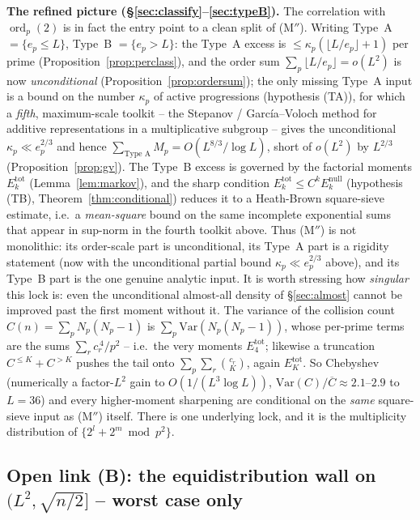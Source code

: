 \documentclass[11pt]{article}
\theoremstyle{plain}
\theoremstyle{definition}
\theoremstyle{remark}
\newcommand{\ord}{\operatorname{ord}}
\newcommand{\ep}{e_p}
\begin{document}
\textbf{The refined picture (\S\ref{sec:classify}--\ref{sec:typeB}).} The
correlation with $\ord_p(2)$ is in fact the entry point to a clean split of
(M$''$). Writing Type~A $=\{\ep\le L\}$, Type~B $=\{\ep>L\}$: the Type~A excess is
$\le\kappa_p(\lfloor L/\ep\rfloor+1)$ per prime (Proposition~\ref{prop:perclass}),
and the order sum $\sum_p\lfloor L/\ep\rfloor=o(L^2)$ is now
\emph{unconditional} (Proposition~\ref{prop:ordersum}); the only missing Type~A
input is a bound on the number $\kappa_p$ of active progressions (hypothesis
(TA)), for which a \emph{fifth}, maximum-scale toolkit -- the Stepanov /
García--Voloch method for additive representations in a multiplicative subgroup --
gives the unconditional $\kappa_p\ll\ep^{2/3}$ and hence
$\sum_{\text{Type A}}M_p=O(L^{8/3}/\log L)$, short of $o(L^2)$ by $L^{2/3}$
(Proposition~\ref{prop:gv}). The Type~B excess is governed by
the factorial moments $E_k^{\mathrm{tot}}$ (Lemma~\ref{lem:markov}), and the sharp
condition $E_k^{\mathrm{tot}}\le C^kE_k^{\mathrm{null}}$ (hypothesis (TB),
Theorem~\ref{thm:conditional}) reduces it to a Heath-Brown square-sieve estimate,
i.e.\ a \emph{mean-square} bound on the same incomplete exponential sums that
appear in sup-norm in the fourth toolkit above. Thus (M$''$) is not monolithic:
its order-scale part is unconditional, its Type~A part is a rigidity statement
(now with the unconditional partial bound $\kappa_p\ll\ep^{2/3}$ above), and its
Type~B part is the one genuine analytic input. It is worth stressing how
\emph{singular} this lock is: even the unconditional almost-all density of
\S\ref{sec:almost} cannot be improved past the first moment without it. The
variance of the collision count $C(n)=\sum_pN_p(N_p-1)$ is
$\sum_p\mathrm{Var}(N_p(N_p-1))$, whose per-prime terms are the sums
$\sum_rc_r^{\,4}/p^2$ -- i.e.\ the very moments $E_4^{\mathrm{tot}}$; likewise a
truncation $C^{\le K}+C^{>K}$ pushes the tail onto $\sum_p\sum_r\binom{c_r}{K}$,
again $E_K^{\mathrm{tot}}$. So Chebyshev (numerically a factor-$L^2$ gain to
$O(1/(L^3\log L))$, $\mathrm{Var}(C)/\overline C\approx2.1$--$2.9$ to $L=36$) and
every higher-moment sharpening are conditional on the \emph{same} square-sieve
input as (M$''$) itself. There is one underlying lock, and it is the
multiplicity distribution of $\{2^l+2^m\bmod p^2\}$.

\subsection{Open link (B): the equidistribution wall on $(L^2,\sqrt{n/2}]$ --
worst case only}
\end{document}
